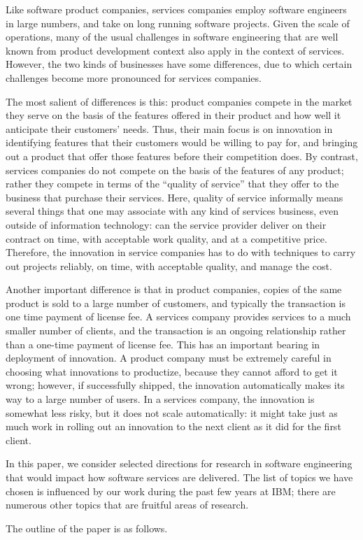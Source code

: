 Like software product companies, services companies employ software engineers in large numbers, and take on long running software projects. Given the scale of operations, many of the usual challenges in software engineering that are well known from product development context also apply in the context of services.  However, the two kinds of businesses have some differences, due to which certain challenges become more pronounced for services companies. 

The most salient of differences is this: product companies compete in the market they serve on the basis of the features offered in their product and how well it anticipate their customers' needs. Thus, their main focus is on innovation in identifying features that their customers would be willing to pay for, and bringing out a product that offer those features before their competition does. By contrast, services companies do not compete on the basis of the features of any product; rather they compete in terms of the ``quality of service'' that they offer to the business that purchase their services. Here, quality of service informally means several things that one may associate with any kind of services business, even outside of information technology: can the service provider deliver on their contract on time, with acceptable work quality, and at a competitive price.  Therefore, the innovation in service companies has to do with techniques to carry out projects reliably, on time, with acceptable quality, and manage the cost.

Another important difference is that in product companies, copies of the same product is sold to a large number of customers, and typically the transaction is one time payment of license fee.  A services company provides services to a much smaller number of clients, and the transaction is an ongoing relationship rather than a one-time payment of license fee. This has an important bearing in deployment of innovation.  A product company must be extremely careful in choosing what innovations to productize, because they cannot afford to get it wrong; however, if successfully shipped, the innovation automatically makes its way to a large number of users.  In a services company, the innovation is somewhat less risky, but it does not scale automatically: it might take just as much work in rolling out an innovation to the next client as it did for the first client.



In this paper, we consider selected directions for research in software engineering that would impact how software services are delivered.  The list of topics we have chosen is influenced by our work during the past few years at IBM; there are numerous other topics that are fruitful areas of research.


The outline of the paper is as follows.

\label{sec:intro}
